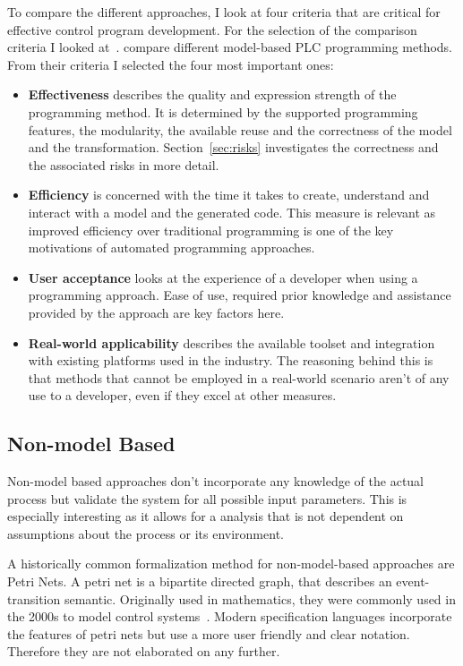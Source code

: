 To compare the different approaches, I look at four criteria that are critical for effective control program development.
For the selection of the comparison criteria I looked at~\cite{VH:2014}.
\citeauthor{VH:2014} compare different model-based PLC programming methods.
From their criteria I selected the four most important ones:
\begin{itemize}
	\item \textbf{Effectiveness} describes the quality and expression strength of the programming method.
	It is determined by the supported programming features, the modularity, the available reuse and the correctness of the model and the transformation.
	Section~\ref{sec:risks} investigates the correctness and the associated risks in more detail.
	\item \textbf{Efficiency} is concerned with the time it takes to create, understand and interact with a model and the generated code.
	This measure is relevant as improved efficiency over traditional programming is one of the key motivations of automated programming approaches.
	\item \textbf{User acceptance} looks at the experience of a developer when using a programming approach.
	Ease of use, required prior knowledge and assistance provided by the approach are key factors here.
	\item \textbf{Real-world applicability} describes the available toolset and integration with existing platforms used in the industry.
	The reasoning behind this is that methods that cannot be employed in a real-world scenario aren't of any use to a developer, even if they excel at other measures.
\end{itemize}

\subsection{Non-model Based}
\label{sec:non_model}

Non-model based approaches don't incorporate any knowledge of the actual process but validate the system for all possible input parameters.
This is especially interesting as it allows for a analysis that is not dependent on assumptions about the process or its environment.

A historically common formalization method for non-model-based approaches are Petri Nets.
A petri net is a bipartite directed graph, that describes an event-transition semantic.
Originally used in mathematics, they were commonly used in the 2000s to model control systems~\cite{Frey:2000:2, Frey:2000aa}.
Modern specification languages incorporate the features of petri nets but use a more user friendly and clear notation.
Therefore they are not elaborated on any further.

